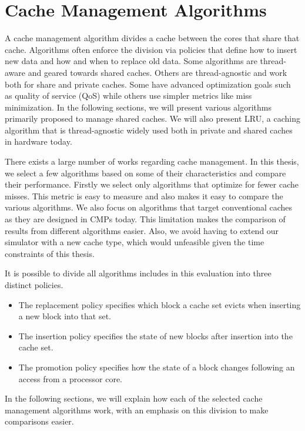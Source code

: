 
\section{Cache Management Algorithms}
\label{sec:background:algorithms}

A cache management algorithm divides a cache between the cores that share that cache.
Algorithms often enforce the division via policies that define how to insert new data and how and when to replace old data.
Some algorithms are thread-aware and geared towards shared caches.
Others are thread-agnostic and work both for share and private caches.
Some have advanced optimization goals such as quality of service (QoS) while others use simpler metrics like miss minimization.
In the following sections, we will present various algorithms primarily proposed to manage shared caches.
We will also present LRU, a caching algorithm that is thread-agnostic widely used both in private and shared caches in hardware today.

There exists a large number of works regarding cache management. 
In this thesis, we select a few algorithms based on some of their characteristics and compare their performance.
Firstly we select only algorithms that optimize for fewer cache misses.
This metric is easy to measure and also makes it easy to compare the various algorithms.
We also focus on algorithms that target conventional caches as they are designed in CMPs today.
This limitation makes the comparison of results from different algorithms easier.
Also, we avoid having to extend our simulator with a new cache type, which would unfeasible given the time constraints of this thesis.

It is possible to divide all algorithms includes in this evaluation into three distinct policies.
\begin{itemize}
\item The replacement policy specifies which block a cache set evicts when inserting a new block into that set.
\item The insertion policy specifies the state of new blocks after insertion into  the cache set.
\item The promotion policy specifies how the state of a block changes following an access from a processor core.
\end{itemize}
In the following sections, we will explain how each of the selected cache management algorithms work, with an emphasis on this division to make comparisons easier.







